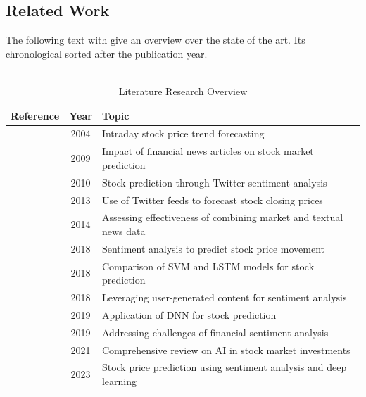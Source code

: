 \subsection{Related Work}\label{sec: Related Work}
The following text with give an overview over the state of the art. Its chronological sorted after the publication year.\\
\\
\begin{table}[H]%
	\centering
	\begin{tabularx}{\textwidth}{|c|c|X|}
		\hline
		\rowcolor{lightgray}
		\hline
		\textbf{Reference} & \textbf{Year} & \textbf{Topic} \\ \hline
		\cite{mittermayer2004} & 2004 & Intraday stock price trend forecasting \\ \hline
		\cite{schumaker2009textual} & 2009 & Impact of financial news articles on stock market prediction \\ \hline
		\cite{Mittal2011StockPU} & 2010 & Stock prediction through Twitter sentiment analysis \\ \hline
		\cite{smailovic2013predictive} & 2013 & Use of Twitter feeds to forecast stock closing prices \\ \hline
		\cite{geva2014empirical} & 2014 & Assessing effectiveness of combining market and textual news data \\ \hline
		\cite{batra2018integrating} & 2018 & Sentiment analysis to predict stock price movement \\ \hline
		\cite{vignesh2018applying} & 2018 & Comparison of \ac{SVM} and \ac{LSTM} models for stock prediction \\ \hline
		\cite{ren2018forecasting} & 2018 & Leveraging user-generated content for sentiment analysis \\ \hline
		\cite{zhong2019predicting} & 2019 & Application of \ac{DNN} for stock prediction \\ \hline
		\cite{araci2019finbert} & 2019 & Addressing challenges of financial sentiment analysis \\ \hline
		\cite{ferreira2021artificial} & 2021 & Comprehensive review on AI in stock market investments \\ \hline
		\cite{Jihan2023} & 2023 & Stock price prediction using sentiment analysis and deep learning \\ \hline
	\end{tabularx}
	\caption{Literature Research Overview}
	\label{tab:literature}
\end{table}

